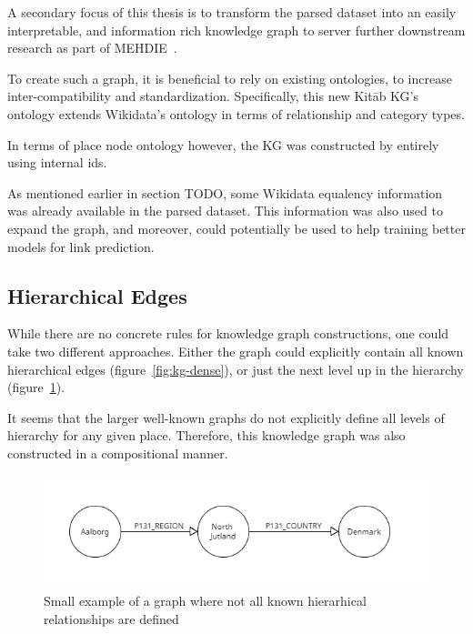 A secondary focus of this thesis is to transform the parsed dataset into an easily interpretable, and information rich
knowledge graph to server further downstream research as part of MEHDIE~\cite{MEHDIE}.

To create such a graph, it is beneficial to rely on existing ontologies, to increase inter-compatibility and standardization.
Specifically, this new Kitāb KG's ontology extends Wikidata's ontology in terms of relationship and category types.

In terms of place node ontology however, the KG was constructed by entirely using internal ids.

As mentioned earlier in section TODO, some Wikidata equalency information was already available in the parsed dataset.
This information was also used to expand the graph, and moreover, could potentially be used to help training better models for link prediction.

\subsection{Hierarchical Edges}
While there are no concrete rules for knowledge graph constructions, one could take two different approaches.
Either the graph could explicitly contain all known hierarchical edges (figure~\ref{fig:kg-dense}),
or just the next level up in the hierarchy (figure~\ref{fig:kg-comp}).

It seems that the larger well-known graphs do not explicitly define all levels of hierarchy for any given place.
Therefore, this knowledge graph was also constructed in a compositional manner.

\begin{figure}[h] %
    \centering %
    \includegraphics[width=0.9\linewidth]{figures/kg-comp} %
    \caption{Small example of a graph where not all known hierarhical relationships are defined} %
    \label{fig:kg-comp} %
\end{figure}

